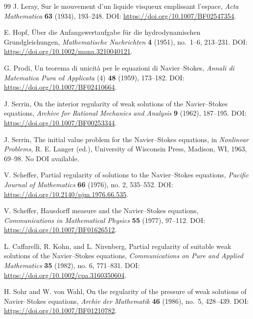 \documentclass[11pt]{article}
\numberwithin{equation}{section}
\begin{document}
\begin{thebibliography}{99}
	J. Leray,
	Sur le mouvement d'un liquide visqueux emplissant l'espace,
	\newblock \emph{Acta Mathematica} \textbf{63} (1934), 193--248.
	\newblock DOI: \url{https://doi.org/10.1007/BF02547354}.

	E. Hopf,
	\"Uber die Anfangswertaufgabe f\"ur die hydrodynamischen Grundgleichungen,
	\newblock \emph{Mathematische Nachrichten} \textbf{4} (1951), no.~1--6, 213--231.
	\newblock DOI: \url{https://doi.org/10.1002/mana.3210040121}.

	G. Prodi,
	Un teorema di unicit\`a per le equazioni di Navier--Stokes,
	\newblock \emph{Annali di Matematica Pura ed Applicata} (4) \textbf{48} (1959), 173--182.
	\newblock DOI: \url{https://doi.org/10.1007/BF02410664}.

	J. Serrin,
	On the interior regularity of weak solutions of the Navier--Stokes equations,
	\newblock \emph{Archive for Rational Mechanics and Analysis} \textbf{9} (1962), 187--195.
	\newblock DOI: \url{https://doi.org/10.1007/BF00253344}.


	J. Serrin,
	The initial value problem for the Navier--Stokes equations,
	\newblock in \emph{Nonlinear Problems}, R. E. Langer (ed.),
	University of Wisconsin Press, Madison, WI, 1963, 69--98.
	\newblock No DOI available.

	V. Scheffer,
	Partial regularity of solutions to the Navier--Stokes equations,
	\newblock \emph{Pacific Journal of Mathematics} \textbf{66} (1976), no. 2, 535--552.
	\newblock DOI: \url{https://doi.org/10.2140/pjm.1976.66.535}.

	V. Scheffer,
	Hausdorff measure and the Navier--Stokes equations,
	\newblock \emph{Communications in Mathematical Physics} \textbf{55} (1977), 97--112.
	\newblock DOI: \url{https://doi.org/10.1007/BF01626512}.

	L. Caffarelli, R. Kohn, and L. Nirenberg,
	Partial regularity of suitable weak solutions of the Navier--Stokes equations,
	\newblock \emph{Communications on Pure and Applied Mathematics} \textbf{35} (1982), no. 6, 771--831.
	\newblock DOI: \url{https://doi.org/10.1002/cpa.3160350604}.

	H. Sohr and W. von Wahl,
	On the regularity of the pressure of weak solutions of Navier--Stokes equations,
	\newblock \emph{Archiv der Mathematik} \textbf{46} (1986), no.~5, 428--439.
	\newblock DOI: \url{https://doi.org/10.1007/BF01210782}.


\end{thebibliography}
\end{document}
